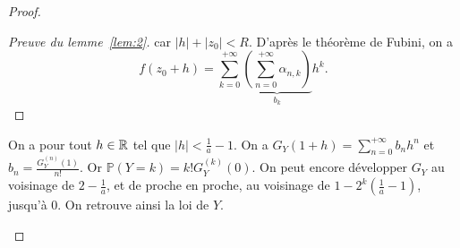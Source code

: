 \documentclass[12pt]{article}
\begin{document}
\begin{proof}
\begin{enumerate}
\begin{proof}[Preuve du lemme~\ref{lem:2}]
            car $\left\lvert h\right\rvert+\left\lvert z_{0}\right\rvert<R$. D'après le théorème de Fubini, on a 
            \begin{equation*}
                f(z_{0}+h)=\sum_{k=0}^{+\infty}\underbrace{\left(\sum_{n=0}^{+\infty}\alpha_{n,k}\right)}_{b_k}h^{k}.
            \end{equation*}
        \end{proof}

        On a pour tout $h\in\mathbb{R}$ tel que $\left\lvert h\right\rvert<\frac{1}{a}-1$. On a $G_Y(1+h)=\sum_{n=0}^{+\infty}b_nh^{n}$ et $b_n=\frac{G_Y^{(n)}(1)}{n!}$. Or $\mathbb{P}(Y=k)=k!G_Y^{(k)}(0)$. On peut encore développer $G_Y$ au voisinage de $2-\frac{1}{a}$, et de proche en proche, au voisinage de $1-2^{k}\left(\frac{1}{a}-1\right)$, jusqu'à 0. On retrouve ainsi la loi de $Y$.
    \end{enumerate}
\end{proof}
\end{document}
